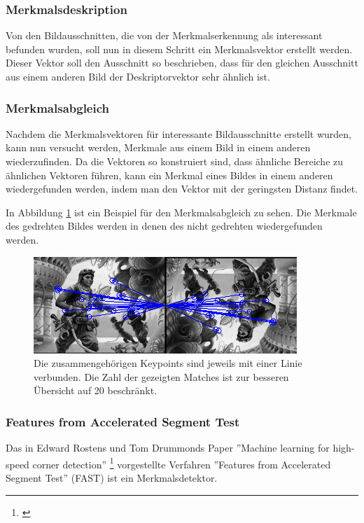 \subsubsection{Merkmalsdeskription}

Von den Bildausschnitten, die von der Merkmalserkennung als interessant befunden wurden, soll nun in diesem Schritt ein Merkmalsvektor erstellt werden.
Dieser Vektor soll den Ausschnitt so beschrieben, dass für den gleichen Ausschnitt aus einem anderen Bild der Deskriptorvektor sehr ähnlich ist.


\subsubsection{Merkmalsabgleich}

Nachdem die Merkmalsvektoren für interessante Bildausschnitte erstellt wurden, kann nun versucht werden, Merkmale aus einem Bild in einem anderen wiederzufinden.
Da die Vektoren so konstruiert sind, dass ähnliche Bereiche zu ähnlichen Vektoren führen, kann ein Merkmal eines Bildes in einem anderen wiedergefunden werden, indem man den Vektor mit der geringsten Distanz findet.


In Abbildung \ref{fig:matchingSample} ist ein Beispiel für den Merkmalsabgleich zu sehen. Die Merkmale des gedrehten Bildes werden in denen des nicht gedrehten wiedergefunden werden.

\begin{figure}[h]

    \centering
		\includegraphics[scale=0.8]{bilder/matchingSample.png}
    	\caption{Die zusammengehörigen Keypoints sind jeweils mit einer Linie verbunden. Die Zahl der gezeigten Matches ist zur besseren Übersicht auf 20 beschränkt.}    	\label{fig:matchingSample}
\end{figure}


\subsubsection{Features from Accelerated Segment Test}
\label{sec:fast}

Das in Edward Rostens und Tom Drummonds Paper ''Machine learning for high-speed corner detection'' \footnote{\cite{Rosten:2006:MLH:2094437.2094478}}  vorgestellte Verfahren ''Features from Accelerated Segment Test'' (FAST) ist ein Merkmalsdetektor.

